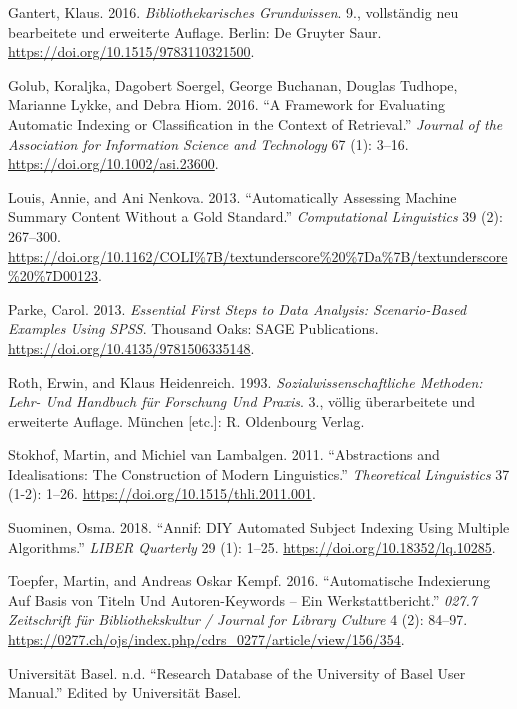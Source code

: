 \hypertarget{refs}{}
\begin{CSLReferences}{1}{0}
\leavevmode\hypertarget{ref-Gantert.2016}{}%
Gantert, Klaus. 2016. \emph{Bibliothekarisches Grundwissen}. 9.,
vollst{ä}ndig neu bearbeitete und erweiterte Auflage. Berlin: {De
Gruyter Saur}. \url{https://doi.org/10.1515/9783110321500}.

\leavevmode\hypertarget{ref-Golub.2016}{}%
Golub, Koraljka, Dagobert Soergel, George Buchanan, Douglas Tudhope,
Marianne Lykke, and Debra Hiom. 2016. {``A Framework for Evaluating
Automatic Indexing or Classification in the Context of Retrieval.''}
\emph{Journal of the Association for Information Science and Technology}
67 (1): 3--16. \url{https://doi.org/10.1002/asi.23600}.

\leavevmode\hypertarget{ref-Louis.2013}{}%
Louis, Annie, and Ani Nenkova. 2013. {``Automatically Assessing Machine
Summary Content Without a Gold Standard.''} \emph{Computational
Linguistics} 39 (2): 267--300.
\url{https://doi.org/10.1162/COLI\%7B/textunderscore\%20\%7Da\%7B/textunderscore\%20\%7D00123}.

\leavevmode\hypertarget{ref-Parke.2013}{}%
Parke, Carol. 2013. \emph{Essential First Steps to Data Analysis:
Scenario-Based Examples Using SPSS}. Thousand Oaks: {SAGE Publications}.
\url{https://doi.org/10.4135/9781506335148}.

\leavevmode\hypertarget{ref-Roth.1993}{}%
Roth, Erwin, and Klaus Heidenreich. 1993. \emph{Sozialwissenschaftliche
Methoden: Lehr- Und Handbuch f{ü}r Forschung Und Praxis}. 3., v{ö}llig
{ü}berarbeitete und erweiterte Auflage. M{ü}nchen {[}etc.{]}: {R.
Oldenbourg Verlag}.

\leavevmode\hypertarget{ref-Stokhof.2011}{}%
Stokhof, Martin, and Michiel van Lambalgen. 2011. {``Abstractions and
Idealisations: The Construction of Modern Linguistics.''}
\emph{Theoretical Linguistics} 37 (1-2): 1--26.
\url{https://doi.org/10.1515/thli.2011.001}.

\leavevmode\hypertarget{ref-Suominen.2018}{}%
Suominen, Osma. 2018. {``Annif: DIY Automated Subject Indexing Using
Multiple Algorithms.''} \emph{LIBER Quarterly} 29 (1): 1--25.
\url{https://doi.org/10.18352/lq.10285}.

\leavevmode\hypertarget{ref-Toepfer.2016}{}%
Toepfer, Martin, and Andreas Oskar Kempf. 2016. {``Automatische
Indexierung Auf Basis von Titeln Und Autoren-Keywords -- Ein
Werkstattbericht.''} \emph{027.7 Zeitschrift f{ü}r Bibliothekskultur /
Journal for Library Culture} 4 (2): 84--97.
\url{https://0277.ch/ojs/index.php/cdrs_0277/article/view/156/354}.

\leavevmode\hypertarget{ref-UniversitatBasel.2021}{}%
Universität Basel. n.d. {``Research Database of the University of Basel
User Manual.''} Edited by Universität Basel.

\end{CSLReferences}
